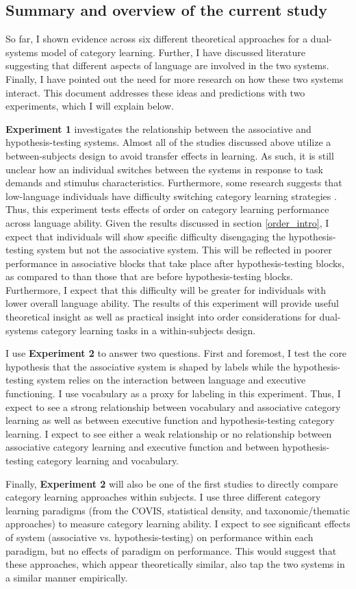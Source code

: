 \documentclass[../dissertation.tex]{subfiles}
\begin{document}
\subsection{Summary and overview of the current study}
	So far, I shown evidence across six different theoretical approaches for a dual-systems model of category learning. Further, I have discussed literature suggesting that different aspects of language are involved in the two systems. Finally, I have pointed out the need for more research on how these two systems interact. This document addresses these ideas and predictions with two experiments, which I will explain below. \par
	\textbf{Experiment 1} investigates the relationship between the associative and hypothesis-testing systems. Almost all of the studies discussed above utilize a between-subjects design to avoid transfer effects in learning. As such, it is still unclear how an individual switches between the systems in response to task demands and stimulus characteristics. Furthermore, some research suggests that low-language individuals have difficulty switching category learning strategies \citep{Ryherd2019}. Thus, this experiment tests effects of order on category learning performance across language ability. Given the results discussed in section \ref{order_intro}, I expect that individuals will show specific difficulty disengaging the hypothesis-testing system but not the associative system. This will be reflected in poorer performance in associative blocks that take place after hypothesis-testing blocks, as compared to than those that are before hypothesis-testing blocks. Furthermore, I expect that this difficulty will be greater for individuals with lower overall language ability. The results of this experiment will provide useful theoretical insight as well as practical insight into order considerations for dual-systems category learning tasks in a within-subjects design. \par
	I use \textbf{Experiment 2} to answer two questions. First and foremost, I test the core hypothesis that the associative system is shaped by labels while the hypothesis-testing system relies on the interaction between language and executive functioning. I use vocabulary as a proxy for labeling in this experiment. Thus, I expect to see a strong relationship between vocabulary and associative category learning as well as between executive function and hypothesis-testing category learning. I expect to see either a weak relationship or no relationship between associative category learning and executive function and between hypothesis-testing category learning and vocabulary. \par
	Finally, \textbf{Experiment 2} will also be one of the first studies to directly compare category learning approaches within subjects. I use three different category learning paradigms (from the COVIS, statistical density, and taxonomic/thematic approaches) to measure category learning ability. I expect to see significant effects of system (associative vs. hypothesis-testing) on performance within each paradigm, but no effects of paradigm on performance. This would suggest that these approaches, which appear theoretically similar, also tap the two systems in a similar manner empirically.
\end{document}
